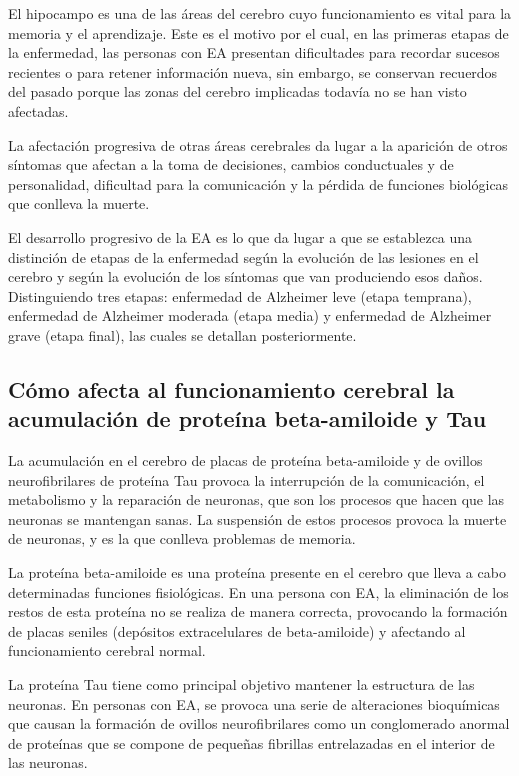 El hipocampo es una de las áreas del cerebro cuyo funcionamiento es vital para la memoria y el aprendizaje.
Este es el motivo por el cual, en las primeras etapas de la enfermedad, las personas con EA presentan dificultades para
recordar sucesos recientes o para retener información nueva, sin embargo, se conservan recuerdos del pasado porque las
zonas del cerebro implicadas todavía no se han visto afectadas.

La afectación progresiva de otras áreas cerebrales da lugar a la aparición de otros síntomas que afectan a la toma de
decisiones, cambios conductuales y de personalidad, dificultad para la comunicación y la pérdida de funciones biológicas
que conlleva la muerte.

El desarrollo progresivo de la EA es lo que da lugar a que se establezca una distinción de etapas de la enfermedad según
la evolución de las lesiones en el cerebro y según la evolución de los síntomas que van produciendo esos daños.
Distinguiendo tres etapas: enfermedad de Alzheimer leve (etapa temprana), enfermedad de Alzheimer moderada (etapa media)
y enfermedad de Alzheimer grave (etapa final), las cuales se detallan posteriormente.

\subsection{Cómo afecta al funcionamiento cerebral la acumulación de proteína beta-amiloide y Tau}\label{subsec:
acumulacion-proteínas}
La acumulación en el cerebro de placas de proteína beta-amiloide y de ovillos neurofibrilares de proteína Tau provoca la
interrupción de la comunicación, el metabolismo y la reparación de neuronas, que son los procesos que hacen que las
neuronas se mantengan sanas.
La suspensión de estos procesos provoca la muerte de neuronas, y es la que conlleva problemas de memoria.

La proteína beta-amiloide es una proteína presente en el cerebro que lleva a cabo determinadas funciones fisiológicas.
En una persona con EA, la eliminación de los restos de esta proteína no se realiza de manera correcta, provocando la
formación de placas seniles (depósitos extracelulares de beta-amiloide) y afectando al funcionamiento cerebral normal.


La proteína Tau tiene como principal objetivo mantener la estructura de las neuronas.
En personas con EA, se provoca una serie de alteraciones bioquímicas que causan la formación de ovillos neurofibrilares
como un conglomerado anormal de proteínas que se compone de pequeñas fibrillas entrelazadas en el interior de las
neuronas.

